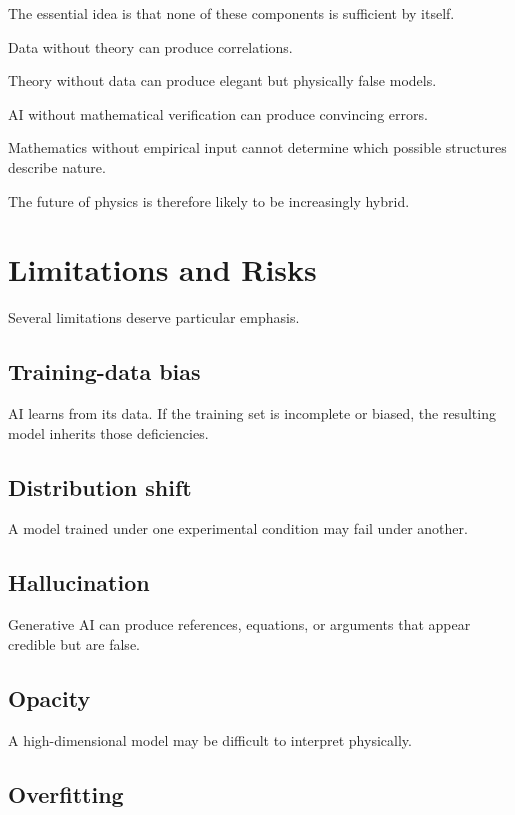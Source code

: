 \documentclass[11pt,a4paper]{article}
\begin{document}
The essential idea is that none of these components is sufficient by itself.

Data without theory can produce correlations.

Theory without data can produce elegant but physically false models.

AI without mathematical verification can produce convincing errors.

Mathematics without empirical input cannot determine which possible structures
describe nature.

The future of physics is therefore likely to be increasingly hybrid.

\section{Limitations and Risks}

Several limitations deserve particular emphasis.

\subsection{Training-data bias}

AI learns from its data. If the training set is incomplete or biased, the
resulting model inherits those deficiencies.

\subsection{Distribution shift}

A model trained under one experimental condition may fail under another.

\subsection{Hallucination}

Generative AI can produce references, equations, or arguments that appear
credible but are false.

\subsection{Opacity}

A high-dimensional model may be difficult to interpret physically.

\subsection{Overfitting}
\end{document}
